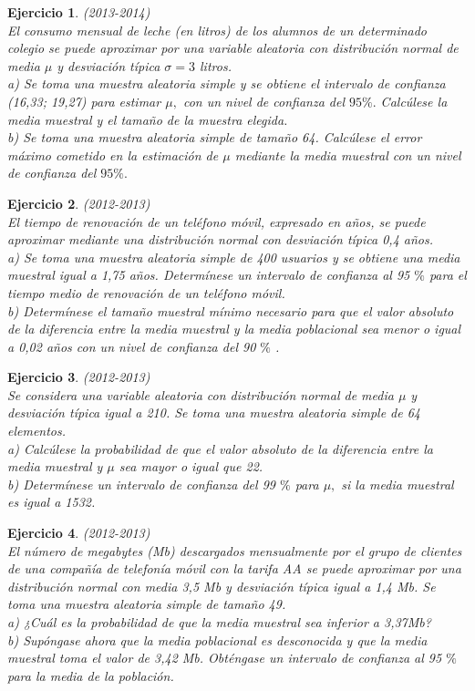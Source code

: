 \documentclass[12pt, a4paper]{amsart}
\newtheorem{ejer}{Ejercicio}
\begin{document}
\begin{ejer}\em (2013-2014)\\
El consumo mensual de leche (en litros) de los alumnos de un determinado colegio se puede aproximar por una variable aleatoria con distribución normal de media $\mu$ y desviación típica $\sigma= 3$ litros.\\
a) Se toma una muestra aleatoria simple y se obtiene el intervalo de confianza (16,33; 19,27) para estimar $\mu,$ con un nivel de confianza del $95\%.$ Calcúlese la media muestral y el tamaño de la muestra elegida.\\
b) Se toma una muestra aleatoria simple de tamaño 64. Calcúlese el error máximo cometido en la estimación de $\mu$ mediante la media muestral con un nivel de confianza del $95\%.$
\end{ejer}

\begin{ejer}\em (2012-2013)\\
El tiempo de renovación de un teléfono móvil, expresado en años, se puede aproximar mediante una
distribución normal con desviación típica 0,4 años.\\
a) Se toma una muestra aleatoria simple de 400 usuarios y se obtiene una media muestral igual a 1,75 años.
Determínese un intervalo de confianza al 95 $\%$ para el tiempo medio de renovación de un teléfono móvil.\\
b) Determínese el tamaño muestral mínimo necesario para que el valor absoluto de la diferencia entre la
media muestral y la media poblacional sea menor o igual a 0,02 años con un nivel de confianza del 90 $\%$ .
\end{ejer}

\begin{ejer}\em (2012-2013)\\
Se considera una variable aleatoria con distribución normal de media $\mu$ y desviación típica igual a 210. Se
toma una muestra aleatoria simple de 64 elementos.\\
a) Calcúlese la probabilidad de que el valor absoluto de la diferencia entre la media muestral y $\mu$ sea mayor
o igual que 22.\\
b) Determínese un intervalo de confianza del 99 $\%$ para $\mu,$ si la media muestral es igual a 1532.
\end{ejer}

\begin{ejer}\em (2012-2013)\\
El número de megabytes (Mb) descargados mensualmente por el grupo de clientes de una compañía de
telefonía móvil con la tarifa AA se puede aproximar por una distribución normal con media 3,5 Mb y
desviación típica igual a 1,4 Mb. Se toma una muestra aleatoria simple de tamaño 49.\\
a) ¿Cuál es la probabilidad de que la media muestral sea inferior a 3,37Mb?\\
b) Supóngase ahora que la media poblacional es desconocida y que la media muestral toma el valor de 3,42
Mb. Obténgase un intervalo de confianza al 95 $\%$ para la media de la población.
\end{ejer}
\end{document}
